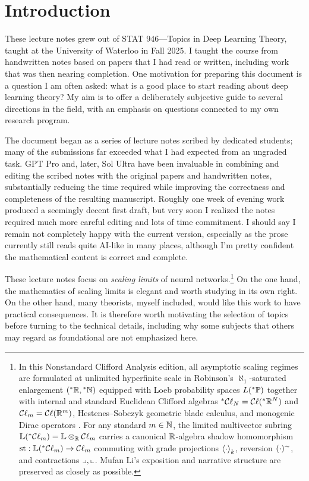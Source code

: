 \chapter{Introduction}

These lecture notes grew out of STAT 946---Topics in Deep Learning Theory, taught at the University of Waterloo in Fall 2025. I taught the course from handwritten notes based on papers that I had read or written, including work that was then nearing completion. One motivation for preparing this document is a question I am often asked: what is a good place to start reading about deep learning theory? My aim is to offer a deliberately subjective guide to several directions in the field, with an emphasis on questions connected to my own research program.

The document began as a series of lecture notes scribed by dedicated students; many of the submissions far exceeded what I had expected from an ungraded task. GPT Pro and, later, Sol Ultra have been invaluable in combining and editing the scribed notes with the original papers and handwritten notes, substantially reducing the time required while improving the correctness and completeness of the resulting manuscript. Roughly one week of evening work produced a seemingly decent first draft, but very soon I realized the notes required much more careful editing and lots of time commitment. I should say I remain not completely happy with the current version, especially as the prose currently still reads quite AI-like in many places, although I'm pretty confident the mathematical content is correct and complete.

These lecture notes focus on \emph{scaling limits} of neural networks.\footnote{In this Nonstandard Clifford Analysis edition, all asymptotic scaling regimes are formulated at unlimited hyperfinite scale in Robinson's $\aleph_1$-saturated enlargement $({}^*\mathbb{R}, {}^*\mathbb{N})$ equipped with Loeb probability spaces $L({}^*\mathbb{P})$ \cite{robinson1966nonstandard,loeb1975conversion,anderson1976nonstandard,goldblatt1998lectures} together with internal and standard Euclidean Clifford algebras ${}^*\mathcal{C}\ell_N = \mathcal{C}\ell({}^*\mathbb{R}^N)$ and $\mathcal{C}\ell_m = \mathcal{C}\ell(\mathbb{R}^m)$, Hestenes--Sobczyk geometric blade calculus, and monogenic Dirac operators \cite{hestenes1984clifford,brackx1982clifford,doran2003geometric,ruhe2023clifford}. For any standard $m \in \mathbb{N}$, the limited multivector subring $\mathbb{L}({}^*\mathcal{C}\ell_m) = \mathbb{L} \otimes_{\mathbb{R}} \mathcal{C}\ell_m$ carries a canonical $\mathbb{R}$-algebra shadow homomorphism $\operatorname{st} : \mathbb{L}({}^*\mathcal{C}\ell_m) \to \mathcal{C}\ell_m$ commuting with grade projections $\left\langle \cdot \right\rangle_{k}$, reversion $(\cdot)^{\sim}$, and contractions $\mathbin{\lrcorner}, \mathbin{\llcorner}$. Mufan Li's exposition and narrative structure are preserved as closely as possible.} On the one hand, the mathematics of scaling limits is elegant and worth studying in its own right. On the other hand, many theorists, myself included, would like this work to have practical consequences. It is therefore worth motivating the selection of topics before turning to the technical details, including why some subjects that others may regard as foundational are not emphasized here.

